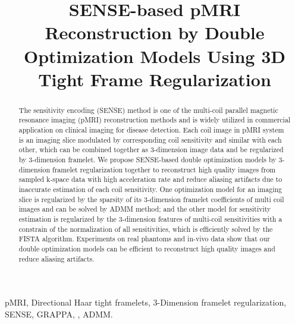 \documentclass[preprint]{elsarticle}
\begin{document}
\begin{frontmatter}

\title{SENSE-based pMRI Reconstruction by Double Optimization Models Using 3D Tight Frame Regularization}



%
%



\begin{abstract}
The sensitivity encoding (SENSE) method is one of the  multi-coil  parallel magnetic resonance imaging (pMRI) reconstruction methods  and is widely utilized in commercial application on
clinical imaging  for disease detection.
Each coil image in pMRI system  is an imaging slice modulated by corresponding coil sensitivity and similar with each other, which can be combined together as 3-dimension image data and be regularized by 3-dimension framelet.
We propose SENSE-based double optimization models by 3-dimension framelet regularization together to reconstruct  high quality images from sampled k-space data with high acceleration rate and   reduce aliasing artifacts due to inaccurate estimation of each coil sensitivity.
One optimization  model for an imaging slice is regularized by the sparsity of  its 3-dimension framelet coefficients of multi coil images and can be solved by ADMM method;  and the other model  for sensitivity estimation  is regularized by the 3-dimension features of multi-coil sensitivities with a constrain of the normalization of all sensitivities, which is efficiently solved by the FISTA algorithm.
Experiments on real phantoms  and in-vivo data  show that our double optimization models can be efficient to reconstruct high quality images  and reduce aliasing artifacts.
\end{abstract}
\begin{keyword}
pMRI, Directional Haar tight framelets, 3-Dimension framelet regularization, SENSE, GRAPPA, , ADMM.
\end{keyword}


\end{frontmatter}
\end{document}
